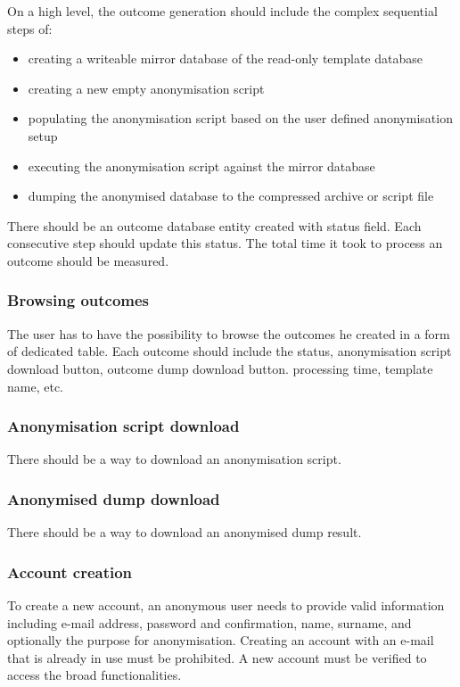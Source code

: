 \documentclass[a4paper,twoside,12pt]{book}
\begin{document}
On a high level, the outcome generation should include the complex sequential steps of:
\begin{itemize}
\item creating a writeable mirror database of the read-only template database
\item creating a new empty anonymisation script
\item populating the anonymisation script based on the user defined anonymisation setup
\item executing the anonymisation script against the mirror database
\item dumping the anonymised database to the compressed archive or script file
\end{itemize} 

There should be an outcome database entity created with status field. Each consecutive step should update this status. The total time it took to process an outcome should be measured.

\subsubsection{Browsing outcomes}

The user has to have the possibility to browse the outcomes he created in a form of dedicated table. Each outcome should include the status, anonymisation script download button, outcome dump download button. processing time, template name, etc.

\subsubsection{Anonymisation script download}

There should be a way to download an anonymisation script.

\subsubsection{Anonymised dump download}

There should be a way to download an anonymised dump result.

\subsubsection{Account creation}

To create a new account, an anonymous user needs to provide valid information including e-mail address, password and confirmation, name, surname, and optionally the purpose for anonymisation. Creating an account with an e-mail that is already in use must be prohibited. A new account must be verified to access the broad functionalities.
\end{document}
